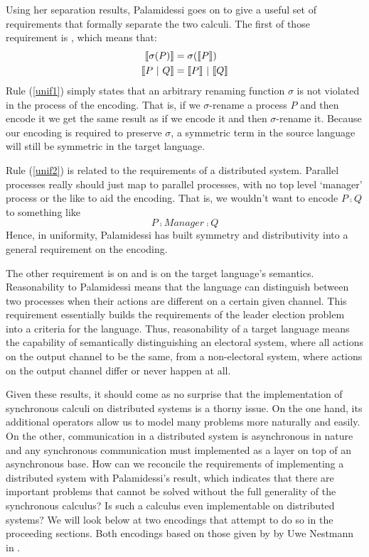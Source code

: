 Using her separation results, Palamidessi goes on to give a useful set of requirements that formally separate the two calculi.
The first of those requirement is , which means that:
\begin{align}
	\llbracket{\sigma(P)}\rrbracket &= \sigma(\llbracket{P}\rrbracket)\label{unif1}\\
	\llbracket{P \ensuremath{\ |\ } Q}\rrbracket &= \llbracket{P}\rrbracket \ |\  \llbracket{Q}\rrbracket\label{unif2}
\end{align}
Rule (\ref{unif1}) simply states that an arbitrary renaming function $\sigma$ is not violated in the process of the encoding.  
That is, if we $\sigma$-rename a process $P$ and then encode it we get the same result as if we encode it and then $\sigma$-rename it.  
Because our encoding is required to preserve $\sigma$, a symmetric term in the source language will still be symmetric in the target language.

Rule (\ref{unif2}) is related to the requirements of a distributed system.  
Parallel processes really should just map to parallel processes, with no top level `manager' process or the like to aid the encoding.  
That is, we wouldn't want to encode $P \comp Q$ to something like 
\[
	P \comp Manager \comp Q
\]
Hence, in uniformity, Palamidessi has built symmetry and distributivity into a general requirement on the encoding.

The other requirement is on  and is on the target language's semantics.  
Reasonability to Palamidessi means that the language can distinguish between two processes when their actions are different on a certain given channel.  
This requirement essentially builds the requirements of the leader election problem into a criteria for the language.  
Thus, reasonability of a target language means the capability of semantically distinguishing an electoral system, where all actions on the output channel to be the same, from a non-electoral system, where actions on the output channel differ or never happen at all.

Given these results, it should come as no surprise that the implementation of synchronous calculi on distributed systems is a thorny issue.  
On the one hand, its additional operators allow us to model many problems more naturally and easily.  
On the other, communication in a distributed system is asynchronous in nature and any synchronous communication must implemented as a layer on top of an asynchronous base.  
How can we reconcile the requirements of implementing a distributed system with Palamidessi's result, which indicates that there are important problems that cannot be solved without the full generality of the synchronous calculus?  
Is such a calculus even implementable on distributed systems?
We will look below at two encodings that attempt to do so in the proceeding sections.  
Both encodings based on those given by by Uwe Nestmann in \cite{nestm00}.

